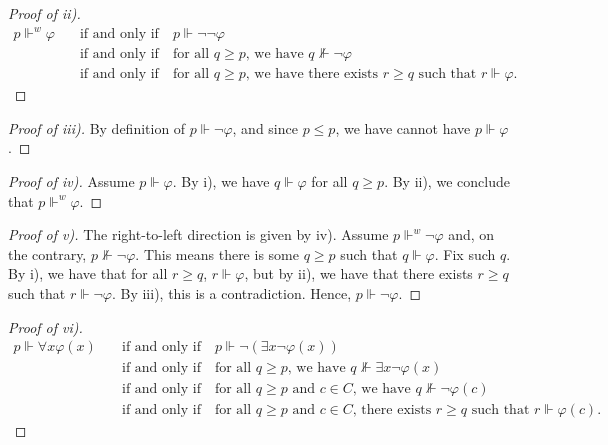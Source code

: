 \documentclass{scrartcl}
\renewcommand{\phi}{\varphi}
\begin{document}
\begin{proof}[Proof of ii)]

\begin{align*}
p\Vdash^w \phi \quad &\text{if and only if} \quad  p\Vdash \neg \neg \phi \\
&\text{if and only if} \quad \text{for all } q\ge p \text{, we have } q \not \Vdash\neg \phi \\
&\text{if and only if} \quad \text{for all } q\ge p \text{, we have there exists } r\ge q \text{ such that } r\Vdash \phi.
\end{align*}

\end{proof}


\begin{proof}[Proof of iii)]
By definition of $p\Vdash \neg \phi$, and since $p\le p$, we have cannot have $p\Vdash \phi$.
\end{proof}

\begin{proof}[Proof of iv)]
Assume $p\Vdash \phi$. By i), we have $q\Vdash \phi$ for all $q\ge p$. By ii), we conclude that $p\Vdash^w \phi$.
\end{proof}

\begin{proof}[Proof of v)]
The right-to-left direction is given by iv). Assume $p\Vdash^w \neg \phi$ and, on the contrary, $p\not \Vdash \neg\phi$. This means there is some $q\ge p$ such that $q\Vdash \phi$. Fix such $q$. By i), we have that for all $r\ge q$, $r\Vdash \phi$, but by ii), we have that there exists $r\ge q$ such that $r\Vdash \neg\phi$. By iii), this is a contradiction. Hence, $p\Vdash \neg \phi$.
\end{proof}

\begin{proof}[Proof of vi)]

\begin{align*}
p\Vdash \forall x \phi(x) \quad &\text{if and only if} \quad  p\Vdash \neg (\exists x \neg \phi(x)) \\
&\text{if and only if} \quad \text{for all } q\ge p \text{, we have } q \not \Vdash \exists x \neg \phi(x) \\
&\text{if and only if} \quad \text{for all } q\ge p \text{ and } c\in C \text{, we have } q\not \Vdash \neg \phi(c) \\
&\text{if and only if} \quad \text{for all } q\ge p \text{ and } c\in C \text{, there exists } r\ge q \text{ such that } r\Vdash \phi(c).
\end{align*}

\end{proof}
\end{document}
